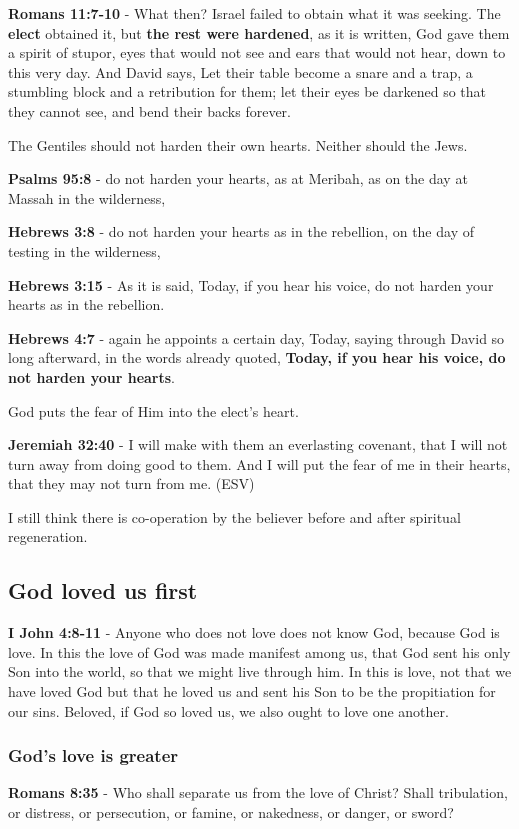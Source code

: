 \documentclass[11pt]{article}
\begin{document}
\textbf{Romans 11:7-10} - What then? Israel failed to obtain what it was seeking. The \textbf{elect} obtained it, but \textbf{the rest were hardened}, as it is written, God gave them a spirit of stupor, eyes that would not see and ears that would not hear, down to this very day.  And David says, Let their table become a snare and a trap, a stumbling block and a retribution for them; let their eyes be darkened so that they cannot see, and bend their backs forever.

The Gentiles should not harden their own hearts. Neither should the Jews.

\textbf{Psalms 95:8} - do not harden your hearts, as at Meribah, as on the day at Massah in the wilderness,

\textbf{Hebrews 3:8} - do not harden your hearts as in the rebellion, on the day of testing in the wilderness,

\textbf{Hebrews 3:15} - As it is said, Today, if you hear his voice, do not harden your hearts as in the rebellion.

\textbf{Hebrews 4:7} - again he appoints a certain day, Today, saying through David so long afterward, in the words already quoted, \textbf{Today, if you hear his voice, do not harden your hearts}.

God puts the fear of Him into the elect's heart.

\textbf{Jeremiah 32:40} - I will make with them an everlasting covenant, that I will not turn away from doing good to them. And I will put the fear of me in their hearts, that they may not turn from me. (ESV)

I still think there is co-operation by the believer before and after spiritual regeneration.

\subsection{God loved us first}
\label{sec:orgb3ee9c6}
\textbf{I John 4:8-11} - Anyone who does not love does not know God, because God is love. In this the love of God was made manifest among us, that God sent his only Son into the world, so that we might live through him. In this is love, not that we have loved God but that he loved us and sent his Son to be the propitiation for our sins. Beloved, if God so loved us, we also ought to love one another.

\subsubsection{God's love is greater}
\label{sec:orgcdfb464}
\textbf{Romans 8:35} - Who shall separate us from the love of Christ? Shall tribulation, or distress, or persecution, or famine, or nakedness, or danger, or sword?
\end{document}
